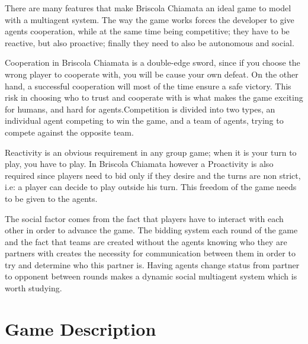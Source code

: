 \documentclass[a4paper]{article}
\begin{document}
There are many features that make Briscola Chiamata an ideal game to model with a multiagent system. The way the game works forces the developer to give agents cooperation, while at the same time being competitive; they have to be reactive, but also proactive; finally they need to also be autonomous and social.

Cooperation in Briscola Chiamata is a double-edge sword, since if you choose the wrong player to cooperate with, you will be cause your own defeat. On the other hand, a successful cooperation will most of the time ensure a safe victory. This risk in choosing who to trust and cooperate with is what makes the game exciting for humans, and hard for agents.Competition is divided into two types, an individual agent competing to win the game, and a team of agents, trying to compete against the opposite team.

Reactivity is an obvious requirement in any group game; when it is your turn to play, you have to play. In Briscola Chiamata however a Proactivity is also required since players need to bid only if they desire and the turns are non strict, i.e: a player can decide to play outside his turn. This freedom of the game needs to be given to the agents.

The social factor comes from the fact that players have to interact with each other in order to advance the game. The bidding system each round of the game and the fact that teams are created without the agents knowing who they are partners with creates the necessity for communication between them in order to try and determine who this partner is. Having agents change status from partner to opponent between rounds makes a dynamic social multiagent system which is worth studying.


\section{Game Description}
\end{document}
